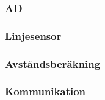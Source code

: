 \subsubsection{AD}

\subsubsection{Linjesensor}


\subsubsection{Avståndsberäkning}


\subsubsection{Kommunikation}

